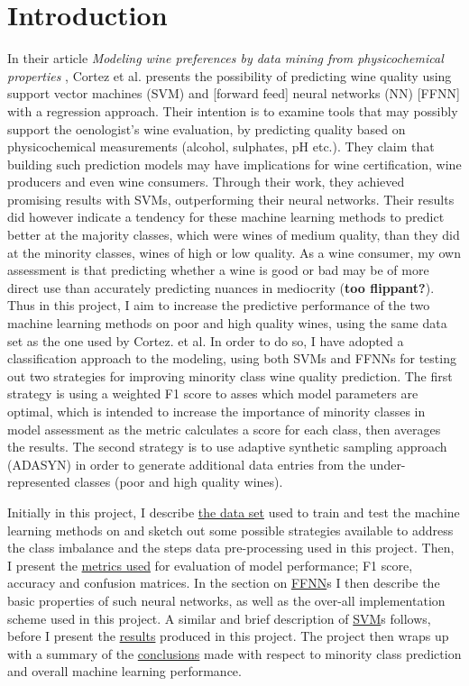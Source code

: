 \documentclass[%
oneside,                 %
final,                   %
10pt]{article}
\begin{document}
\section{Introduction}
In their article \textit{Modeling wine preferences by data mining from physicochemical properties} \cite{CortezPaulo}, Cortez et al. presents the possibility of predicting wine quality using support vector machines (SVM) and [forward feed] neural networks (NN) [FFNN] with a regression approach. Their intention is to examine tools that may possibly support the oenologist's wine evaluation, by predicting quality based on physicochemical measurements (alcohol, sulphates, pH etc.). They claim that building such prediction models may have implications for wine certification, wine producers and even wine consumers. Through their work, they achieved promising results with SVMs, outperforming their neural networks. Their results did however indicate a tendency for these machine learning methods to predict better at the majority classes, which were wines of medium quality, than they did at the minority classes, wines of high or low quality. As a wine consumer, my own assessment is that predicting whether a wine is good or bad may be of more direct use than accurately predicting nuances in mediocrity (\textbf{too flippant?}). Thus in this project, I aim to increase the predictive performance of the two machine learning methods on poor and high quality wines, using the same data set as the one used by Cortez. et al. In order to do so, I have adopted a classification approach to the modeling, using both SVMs and FFNNs for testing out two strategies for improving minority class wine quality prediction. The first strategy is using a weighted F1 score to asses which model parameters are optimal, which is intended to increase the importance of minority classes in model assessment as the metric calculates a score for each class, then averages the results. The second strategy is to use adaptive synthetic sampling approach (ADASYN) in order to generate additional data entries from the under-represented classes (poor and high quality wines).

Initially in this project, I describe \hyperref[data_pp]{the data set} used to train and test the machine learning methods on and sketch out some possible strategies available to address the class imbalance and the steps data pre-processing used in this project. Then, I present the 
\hyperref[evaluation]{metrics used} for evaluation of model performance; F1 score, accuracy and confusion matrices. In the section on  \hyperref[FFNN]{FFNN}s I then describe the basic properties of such neural networks, as well as the over-all implementation scheme used in this project. A similar and brief description of \hyperref[SVM]{SVM}s follows, before I present the \hyperref[results]{results} produced in this project. The project then wraps up with a summary of the \hyperref[conclusions]{conclusions} made with respect to minority class prediction and overall machine learning performance.
\end{document}
